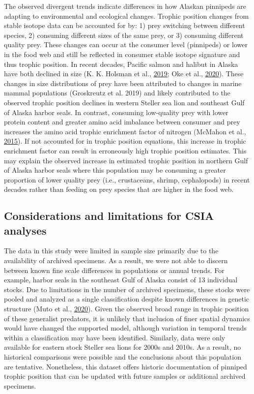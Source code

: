 \documentclass [11pt, proquest] {uwthesis}[2015/03/03]
\begin{document}
The observed divergent trends indicate differences in how Alaskan
pinnipeds are adapting to environmental and ecological changes. Trophic
position changes from stable isotope data can be accounted for by: 1)
prey switching between different species, 2) consuming different sizes
of the same prey, or 3) consuming different quality prey. These changes
can occur at the consumer level (pinnipeds) or lower in the food web and
still be reflected in consumer stable isotope signature and thus trophic
position. In recent decades, Pacific salmon and halibut in Alaska have
both declined in size (K. K. Holsman et al.,
\protect\hyperlink{ref-Holsman2019}{2019}; Oke et al.,
\protect\hyperlink{ref-Oke2020}{2020}). These changes in size
distributions of prey have been attributed to changes in marine mammal
populations (Groskreutz et al. 2019) and likely contributed to the
observed trophic position declines in western Steller sea lion and
southeast Gulf of Alaska harbor seals. In contrast, consuming
low-quality prey with lower protein content and greater amino acid
imbalance between consumer and prey increases the amino acid trophic
enrichment factor of nitrogen (McMahon et al.,
\protect\hyperlink{ref-McMahon2015}{2015}). If not accounted for in
trophic position equations, this increase in trophic enrichment factor
can result in erroneously high trophic position estimates. This may
explain the observed increase in estimated trophic position in northern
Gulf of Alaska harbor seals where this population may be consuming a
greater proportion of lower quality prey (i.e., crustaceans, shrimp,
cephalopods) in recent decades rather than feeding on prey species that
are higher in the food web.

\subsection{Considerations and limitations for CSIA
analyses}\label{considerations-and-limitations-for-csia-analyses}

The data in this study were limited in sample size primarily due to the
availability of archived specimens. As a result, we were not able to
discern between known fine scale differences in populations or annual
trends. For example, harbor seals in the southeast Gulf of Alaska
consist of 13 individual stocks. Due to limitations in the number of
archived specimens, these stocks were pooled and analyzed as a single
classification despite known differences in genetic structure (Muto et
al., \protect\hyperlink{ref-Muto2020}{2020}). Given the observed broad
range in trophic position of these generalist predators, it is unlikely
that inclusion of finer spatial dynamics would have changed the
supported model, although variation in temporal trends within a
classification may have been identified. Similarly, data were only
available for eastern stock Steller sea lions for 2000s and 2010s. As a
result, no historical comparisons were possible and the conclusions
about this population are tentative. Nonetheless, this dataset offers
historic documentation of pinniped trophic position that can be updated
with future samples or additional archived specimens.
\end{document}
